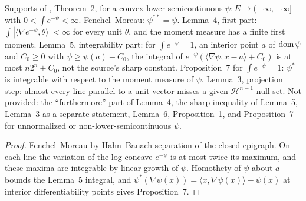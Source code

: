 \begin{lemma}
  \label{lem:cek-legendre-integrability}
  \leanok
  Supports of \cite{CorderoKlartag2015}, Theorem~2, for a convex lower semicontinuous $\psi\colon E\to(-\infty,+\infty]$
  with $0<\int e^{-\psi}<\infty$. Fenchel--Moreau: $\psi^{**}=\psi$. Lemma~4, first part: $\int|\langle\nabla
  e^{-\psi},\theta\rangle|<\infty$ for every unit $\theta$, and the moment measure has a finite first moment. Lemma~5,
  integrability part: for $\int e^{-\psi}=1$, an interior point $a$ of $\operatorname{dom}\psi$ and $C_0\ge0$ with
  $\psi\ge\psi(a)-C_0$, the integral of $e^{-\psi}(\langle\nabla\psi,x-a\rangle+C_0)$ is at most $n2^n+C_0$, not the
  source's sharp constant. Proposition~7 for $\int e^{-\psi}=1$: $\psi^*$ is integrable with respect to the moment
  measure of $\psi$. Lemma~3, projection step: almost every line parallel to a unit vector misses a given
  $\mathcal H^{n-1}$-null set. Not provided: the ``furthermore'' part of Lemma~4, the sharp inequality of Lemma~5,
  Lemma~3 as a separate statement, Lemma~6, Proposition~1, and Proposition~7 for unnormalized or
  non-lower-semicontinuous $\psi$.
\end{lemma}
\begin{proof}
  \leanok
  Fenchel--Moreau by Hahn--Banach separation of the closed epigraph. On each line the variation of the log-concave
  $e^{-\psi}$ is at most twice its maximum, and these maxima are integrable by linear growth of $\psi$. Homothety of
  $\psi$ about $a$ bounds the Lemma~5 integral, and $\psi^*(\nabla\psi(x))=\langle x,\nabla\psi(x)\rangle-\psi(x)$ at
  interior differentiability points gives Proposition~7.
\end{proof}


